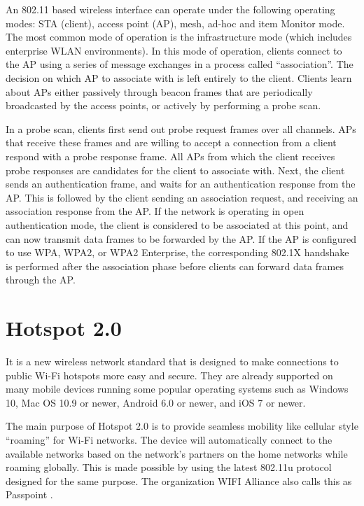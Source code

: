 An 802.11 based wireless interface can operate under the following operating modes: STA (client), access point (AP), mesh, ad-hoc and item Monitor mode. The most common mode of operation is the infrastructure mode (which includes enterprise WLAN environments). In this mode of operation, clients connect to the AP using a series of message exchanges in a process called “association”. The decision on which AP to associate with is left entirely to the client. Clients learn about APs either passively through beacon frames that are periodically broadcasted by the access points, or actively by performing a probe scan. 

In a probe scan, clients first send out probe request frames over all channels. APs that receive these frames and are willing to accept a connection from a client respond with a probe response frame. All APs from which the client receives probe responses are candidates for the client to associate with. Next, the client sends an authentication frame, and waits for an authentication response from the AP. This is followed by the client sending an association request, and receiving an association response from the AP. If the network is operating in open authentication mode, the client is considered to be
associated at this point, and can now transmit data frames to be forwarded by the AP. If the AP is configured to use WPA, WPA2, or WPA2 Enterprise, the corresponding 802.1X \cite{hostapd} handshake is performed after the association phase before clients can forward data frames through the AP.


\section{Hotspot 2.0 \cite{Hotspot_2.0_Definition}} \label{Hotspot2.0}

It is a new wireless network standard that is designed to make connections to public Wi-Fi hotspots more easy and secure. They are already supported on many mobile devices running some popular operating systems such as Windows 10, Mac OS 10.9 or newer, Android 6.0 or newer, and iOS 7 or newer.

The main purpose of Hotspot 2.0 is to provide seamless mobility like cellular style “roaming” for Wi-Fi networks. The device will automatically connect to the available networks based on the network's partners on the home networks while roaming globally. This is made possible by using the latest 802.11u \cite{IEEE802.11u} protocol designed for the same purpose. The organization WIFI Alliance also calls this as Passpoint \cite{Passpoint}.